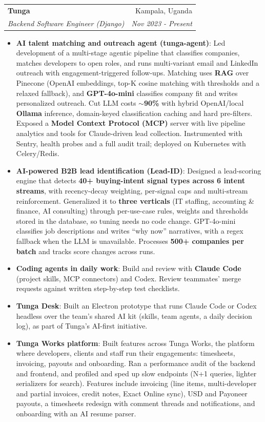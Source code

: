 \documentclass[letterpaper,11pt]{article}
\makeatletter
\newcommand{\resumeItem}[2]{
  \item\small{
    \textbf{#1}{: #2 \vspace{-2pt}}
  }
}
\newcommand{\resumeSubheading}[4]{
  \vspace{-1pt}\item
    \begin{tabular*}{0.97\textwidth}{l@{\extracolsep{\fill}}r}
      \textbf{#1} & #2 \\
      \textit{\small#3} & \textit{\small #4} \\
    \end{tabular*}\vspace{-5pt}
}
\newcommand{\resumeItemListStart}{\begin{itemize}}
\newcommand{\resumeItemListEnd}{\end{itemize}\vspace{-5pt}}
\makeatother
\begin{document}
    \resumeSubheading
      {Tunga}{Kampala, Uganda}
  {Backend Software Engineer (Django)}{Nov 2023 - Present}
  \resumeItemListStart
    \resumeItem{AI talent matching and outreach agent (tunga-agent)}
      {Led development of a multi-stage agentic pipeline that classifies companies, matches developers to open roles, and runs multi-variant email and LinkedIn outreach with engagement-triggered follow-ups. Matching uses \textbf{RAG} over Pinecone (OpenAI embeddings, top-K cosine matching with thresholds and a relaxed fallback), and \textbf{GPT-4o-mini} classifies company fit and writes personalized outreach. Cut LLM costs \textbf{$\sim$90\%} with hybrid OpenAI/local \textbf{Ollama} inference, domain-keyed classification caching and hard pre-filters. Exposed a \textbf{Model Context Protocol (MCP)} server with live pipeline analytics and tools for Claude-driven lead collection. Instrumented with Sentry, health probes and a full audit trail; deployed on Kubernetes with Celery/Redis.}
    \resumeItem{AI-powered B2B lead identification (Lead-ID)}
      {Designed a lead-scoring engine that detects \textbf{40+ buying-intent signal types across 6 intent streams}, with recency-decay weighting, per-signal caps and multi-stream reinforcement. Generalized it to \textbf{three verticals} (IT staffing, accounting \& finance, AI consulting) through per-use-case rules, weights and thresholds stored in the database, so tuning needs no code change. GPT-4o-mini classifies job descriptions and writes ``why now'' narratives, with a regex fallback when the LLM is unavailable. Processes \textbf{500+ companies per batch} and tracks score changes across runs.}
    \resumeItem{Coding agents in daily work}
      {Build and review with \textbf{Claude Code} (project skills, MCP connectors) and Codex. Review teammates' merge requests against written step-by-step test checklists.}
    \resumeItem{Tunga Desk}
      {Built an Electron prototype that runs Claude Code or Codex headless over the team's shared AI kit (skills, team agents, a daily decision log), as part of Tunga's AI-first initiative.}
    \resumeItem{Tunga Works platform}
      {Built features across Tunga Works, the platform where developers, clients and staff run their engagements: timesheets, invoicing, payouts and onboarding. Ran a performance audit of the backend and frontend, and profiled and sped up slow endpoints (N+1 queries, lighter serializers for search). Features include invoicing (line items, multi-developer and partial invoices, credit notes, Exact Online sync), USD and Payoneer payouts, a timesheets redesign with comment threads and notifications, and onboarding with an AI resume parser.}
  \resumeItemListEnd
\end{document}
